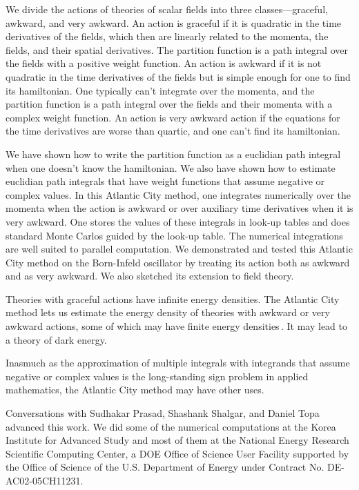 \documentclass[prd,preprint,floatfix,showpacs]{revtex4-1}
\begin{document}
We divide the actions 
of theories of scalar fields
into three classes---graceful, 
awkward, and very awkward.
An action is graceful if it is quadratic
in the time derivatives of the fields,
which then are 
linearly related to the momenta,
the fields, and
their spatial derivatives.
The partition function is
a path integral over the fields
with a positive weight function.
An action is awkward if it
is not quadratic
in the time derivatives of the fields but is simple
enough for one to find its hamiltonian.
One typically can't integrate over the momenta,
and the partition function is a path integral
over the fields and their momenta
with a complex weight function.
An action is very awkward action if 
the equations for the time derivatives 
are worse than quartic,
and one can't find its hamiltonian.
\par
We have shown how to write 
the partition function as a
euclidian path integral 
when one doesn't know
the hamiltonian.
We also have shown how
to estimate euclidian path integrals
that have weight functions 
that assume negative or complex values.
In this Atlantic City method,
one integrates numerically
over the momenta when the action
is awkward or over
auxiliary time derivatives
when it is very awkward.
One stores the values of these integrals
in look-up tables
and does standard 
Monte Carlos guided by
the look-up table. 
The numerical integrations
are well suited to parallel computation.
We demonstrated and tested
this Atlantic City method
on the Born-Infeld oscillator
by treating its action both
as awkward and as very awkward.
We also sketched its extension 
to field theory.
\par
Theories with graceful actions
have infinite energy densities. 
The Atlantic City method lets us
estimate the energy density
of theories with awkward
or very awkward 
actions, some of which 
may have finite energy 
densities\,\cite{Bender1990, *Cahill2013NA, 
*PhysRevD.88.125014NA}\@.
It may lead
to a theory of dark energy. 
\par 
Inasmuch as the approximation of multiple
integrals with integrands
that assume negative or complex values
is the long-standing sign problem 
in applied mathematics,
the Atlantic City method
may have other uses.


\begin{acknowledgments}
Conversations with 
Sudhakar Prasad, Shashank Shalgar,
and Daniel Topa
advanced this work.  
We did some of the
numerical computations at 
the Korea Institute for Advanced Study
and most of them
at the  National Energy Research Scientific Computing Center, a DOE Office of Science User Facility supported by the Office of Science of the U.S. Department of Energy under Contract 
No. DE-AC02-05CH11231.
\end{acknowledgments}
\end{document}
